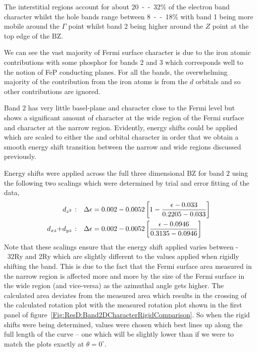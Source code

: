 The interstitial regions account for about \unit{20--32}{\%} of the electron band character whilst the hole bands range between \unit{8--18}{\%} with band 1 being more mobile around the $\Gamma$ point whilst band 2 being higher around the $Z$ point at the top edge of the \ac{BZ}.

We can see the vast majority of Fermi surface character is due to the iron atomic contributions with some phosphor for bands 2 and 3 which corresponds well to the notion of FeP conducting planes. For all the bands, the overwhelming majority of the contribution from the iron atoms is from the $d$ orbitals and so other contributions are ignored.

Band $2$ has very little basel-plane \Dxy and \DxTwoyTwo character close to the Fermi level but shows a significant amount of \DzTwo character at the wide region of the Fermi surface and \DxzDyz character at the narrow region. Evidently, energy shifts could be applied which are scaled to either the \DzTwo and \DxzDyz orbital character in order that we obtain a smooth energy shift transition between the narrow and wide regions discussed previously. 

Energy shifts were applied across the full three dimensional \ac{BZ} for band $2$ using the following two scalings which were determined by trial and error fitting of the data,
\begin{align*}
\textrm{\DzTwo:}\quad \Delta\epsilon &= 0.002 - 0.0052 \left[1 - \frac{\epsilon - 0.033}{0.2205 - 0.033}\right] \\
\textrm{\DxzDyz:}\quad \Delta\epsilon &= 0.002 - 0.0052 \left[\frac{\epsilon - 0.0946}{0.3135 - 0.0946}\right]
\end{align*}
Note that these scalings ensure that the energy shift applied varies between \unit{-32}{\milli\textrm{Ry}} and \unit{2}{\milli\textrm{Ry}} which are slightly different to the values applied when rigidly shifting the band. This is due to the fact that the Fermi surface area measured in the narrow region is affected more and more by the size of the Fermi surface in the wide region (and vice-versa) as the azimuthal angle gets higher. The calculated area deviates from the measured area which results in the crossing of the calculated rotation plot with the measured rotation plot shown in the first panel of figure~\ref{Fig:ResD:Band2DCharacterRigidComparison}. So when the rigid shifts were being determined, values were chosen which best lines up along the full length of the curve -- one which will be slightly lower than if we were to match the plots exactly at $\theta=0^\circ$.

